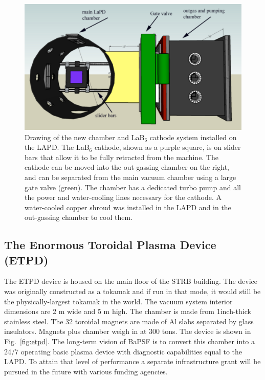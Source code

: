 \documentclass[11pt]{article}
\begin{document}
\begin{figure}[htbp] %
   \centering
   \includegraphics[width=6in]{lab6cartoon.jpg} 
   \caption{\small Drawing of the new chamber and LaB$_{6}$ cathode system installed on the LAPD.  The LaB$_{6}$ cathode, shown as a purple square, is on slider bars that allow it to be fully retracted from the machine.  The cathode can be moved into the out-gassing chamber on the right, and can be separated from the main vacuum chamber using a large gate valve (green).  The chamber has a dedicated turbo pump and all the power and water-cooling lines necessary for the cathode.  A water-cooled copper shroud was installed in the LAPD and in the out-gassing chamber to cool them.}
   \label{fig:lab6cartoon}
\end{figure}
		
		


\subsection{The Enormous Toroidal Plasma Device (ETPD)}
The ETPD device is housed on the main floor of the STRB building.  The device was originally constructed as a tokamak and if run in that mode, it would still be the physically-largest tokamak in the world.  The vacuum system interior dimensions are 2 m wide and 5 m high.  The chamber is made from 1inch-thick stainless steel.  The 32 toroidal magnets are made of Al slabs separated by glass insulators.  Magnets plus chamber weigh in at 300 tons. The device is shown in Fig.\ \ref{fig:etpd}.   The long-term vision of BaPSF is to convert this chamber into a 24/7 operating basic plasma device with diagnostic capabilities equal to the LAPD. To attain that level of performance a separate infrastructure grant will be pursued in the future with various funding agencies. 
\end{document}

